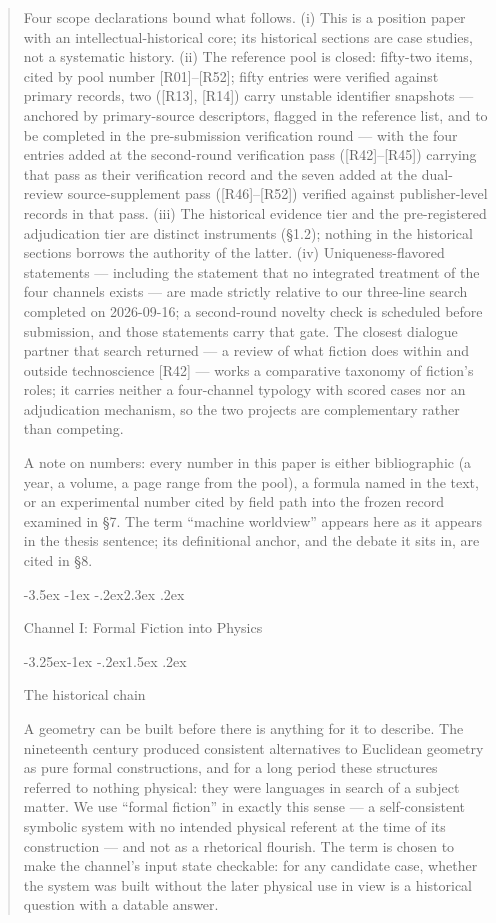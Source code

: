 \documentclass[11pt,a4paper]{article}
\makeatletter
\renewcommand\section{\@startsection{section}{1}{\z@}%
  {-3.5ex \@plus -1ex \@minus -.2ex}{2.3ex \@plus .2ex}%
  {\normalfont\Large\bfseries\raggedright}}
\renewcommand\subsection{\@startsection{subsection}{2}{\z@}%
  {-3.25ex\@plus -1ex \@minus -.2ex}{1.5ex \@plus .2ex}%
  {\normalfont\large\bfseries\raggedright}}
\makeatother
\begin{document}
\begin{abstract}
Four scope declarations bound what follows. (i) This is a position paper with an intellectual-historical core; its historical sections are case studies, not a systematic history. (ii) The reference pool is closed: fifty-two items, cited by pool number [R01]–[R52]; fifty entries were verified against primary records, two ([R13], [R14]) carry unstable identifier snapshots — anchored by primary-source descriptors, flagged in the reference list, and to be completed in the pre-submission verification round — with the four entries added at the second-round verification pass ([R42]–[R45]) carrying that pass as their verification record and the seven added at the dual-review source-supplement pass ([R46]–[R52]) verified against publisher-level records in that pass. (iii) The historical evidence tier and the pre-registered adjudication tier are distinct instruments (§1.2); nothing in the historical sections borrows the authority of the latter. (iv) Uniqueness-flavored statements — including the statement that no integrated treatment of the four channels exists — are made strictly relative to our three-line search completed on 2026-09-16; a second-round novelty check is scheduled before submission, and those statements carry that gate. The closest dialogue partner that search returned — a review of what fiction does within and outside technoscience [R42] — works a comparative taxonomy of fiction's roles; it carries neither a four-channel typology with scored cases nor an adjudication mechanism, so the two projects are complementary rather than competing.

A note on numbers: every number in this paper is either bibliographic (a year, a volume, a page range from the pool), a formula named in the text, or an experimental number cited by field path into the frozen record examined in §7. The term ``machine worldview'' appears here as it appears in the thesis sentence; its definitional anchor, and the debate it sits in, are cited in §8.

\section{Channel I: Formal Fiction into Physics}

\subsection{The historical chain}

A geometry can be built before there is anything for it to describe. The nineteenth century produced consistent alternatives to Euclidean geometry as pure formal constructions, and for a long period these structures referred to nothing physical: they were languages in search of a subject matter. We use ``formal fiction'' in exactly this sense — a self-consistent symbolic system with no intended physical referent at the time of its construction — and not as a rhetorical flourish. The term is chosen to make the channel's input state checkable: for any candidate case, whether the system was built without the later physical use in view is a historical question with a datable answer.


\end{abstract}
\end{document}
